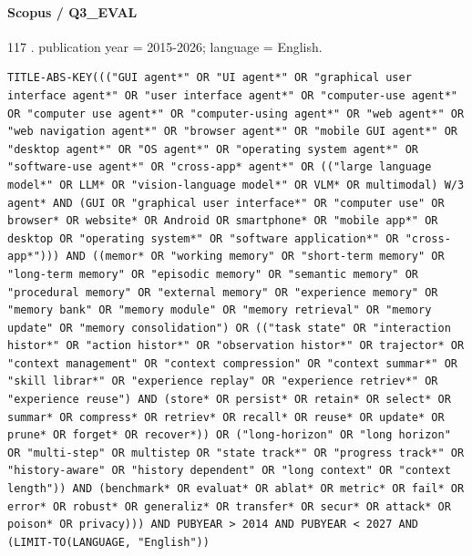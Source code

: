 \noindent\begin{minipage}{\linewidth}
\paragraph{Scopus / Q3\_EVAL}
117 .
publication year = 2015-2026; language = English.
\begin{lstlisting}
TITLE-ABS-KEY((("GUI agent*" OR "UI agent*" OR "graphical user interface agent*" OR "user interface agent*" OR "computer-use agent*" OR "computer use agent*" OR "computer-using agent*" OR "web agent*" OR "web navigation agent*" OR "browser agent*" OR "mobile GUI agent*" OR "desktop agent*" OR "OS agent*" OR "operating system agent*" OR "software-use agent*" OR "cross-app* agent*" OR (("large language model*" OR LLM* OR "vision-language model*" OR VLM* OR multimodal) W/3 agent* AND (GUI OR "graphical user interface*" OR "computer use" OR browser* OR website* OR Android OR smartphone* OR "mobile app*" OR desktop OR "operating system*" OR "software application*" OR "cross-app*"))) AND ((memor* OR "working memory" OR "short-term memory" OR "long-term memory" OR "episodic memory" OR "semantic memory" OR "procedural memory" OR "external memory" OR "experience memory" OR "memory bank" OR "memory module" OR "memory retrieval" OR "memory update" OR "memory consolidation") OR (("task state" OR "interaction histor*" OR "action histor*" OR "observation histor*" OR trajector* OR "context management" OR "context compression" OR "context summar*" OR "skill librar*" OR "experience replay" OR "experience retriev*" OR "experience reuse") AND (store* OR persist* OR retain* OR select* OR summar* OR compress* OR retriev* OR recall* OR reuse* OR update* OR prune* OR forget* OR recover*)) OR ("long-horizon" OR "long horizon" OR "multi-step" OR multistep OR "state track*" OR "progress track*" OR "history-aware" OR "history dependent" OR "long context" OR "context length")) AND (benchmark* OR evaluat* OR ablat* OR metric* OR fail* OR error* OR robust* OR generaliz* OR transfer* OR secur* OR attack* OR poison* OR privacy))) AND PUBYEAR > 2014 AND PUBYEAR < 2027 AND (LIMIT-TO(LANGUAGE, "English"))
\end{lstlisting}
\end{minipage}\par\medskip
